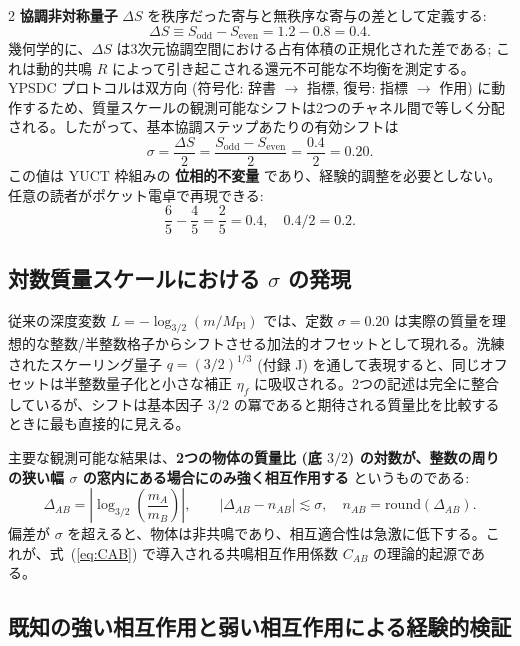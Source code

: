 \documentclass[11pt,a4paper]{article}
\theoremstyle{remark}
\begin{document}
\begin{multicols}{2}
		\textbf{協調非対称量子} \(\Delta S\) を秩序だった寄与と無秩序な寄与の差として定義する:
		\begin{equation}
			\Delta S \equiv S_{\mathrm{odd}} - S_{\mathrm{even}} = 1.2 - 0.8 = 0.4.
			\label{eq:Deltas}
		\end{equation}
		幾何学的に、\(\Delta S\) は3次元協調空間における占有体積の正規化された差である; これは動的共鳴 \(R\) によって引き起こされる還元不可能な不均衡を測定する。YPSDC プロトコルは双方向 (符号化: 辞書 \(\to\) 指標, 復号: 指標 \(\to\) 作用) に動作するため、質量スケールの観測可能なシフトは2つのチャネル間で等しく分配される。したがって、基本協調ステップあたりの有効シフトは
		\begin{equation}
			\boxed{\sigma = \frac{\Delta S}{2} = \frac{S_{\mathrm{odd}} - S_{\mathrm{even}}}{2} = \frac{0.4}{2} = 0.20.}
			\label{eq:sigma}
		\end{equation}
		この値は YUCT 枠組みの \textbf{位相的不変量} であり、経験的調整を必要としない。任意の読者がポケット電卓で再現できる:
		\[
		\frac{6}{5} - \frac{4}{5} = \frac{2}{5} = 0.4,\quad 0.4 / 2 = 0.2.
		\]
		
		\subsection{対数質量スケールにおける \(\sigma\) の発現}
		
		従来の深度変数 \(L = -\log_{3/2}(m/M_{\mathrm{Pl}})\) では、定数 \(\sigma = 0.20\) は実際の質量を理想的な整数/半整数格子からシフトさせる加法的オフセットとして現れる。洗練されたスケーリング量子 \(q = (3/2)^{1/3}\) (付録 J) を通して表現すると、同じオフセットは半整数量子化と小さな補正 \(\eta_f\) に吸収される。2つの記述は完全に整合しているが、シフトは基本因子 \(3/2\) の冪であると期待される質量比を比較するときに最も直接的に見える。
		
		主要な観測可能な結果は、\textbf{2つの物体の質量比 (底 \(3/2\)) の対数が、整数の周りの狭い幅 $\sigma$ の窓内にある場合にのみ強く相互作用する} というものである:
		\[
		\Delta_{AB} = \left| \log_{3/2}\left( \frac{m_A}{m_B} \right) \right|,\qquad
		|\Delta_{AB} - n_{AB}| \lesssim \sigma,\quad n_{AB} = \text{round}(\Delta_{AB}).
		\]
		偏差が $\sigma$ を超えると、物体は非共鳴であり、相互適合性は急激に低下する。これが、式~(\ref{eq:CAB}) で導入される共鳴相互作用係数 \(C_{AB}\) の理論的起源である。
		
		\subsection{既知の強い相互作用と弱い相互作用による経験的検証}
		

\end{multicols}
\end{document}

